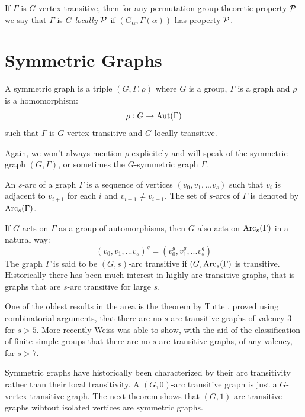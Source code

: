 If $\Gamma$ is $G$-vertex transitive,
then for any permutation group theoretic property $\mathcal{P}$
we say that $\Gamma$ is {\it $G$-locally $\mathcal{P}$}
if $(G_\alpha, \Gamma(\alpha))$ has property $\mathcal{P}$.

\section{Symmetric Graphs}

\begin{definition} 

A symmetric graph is a triple $(G,\Gamma,\rho)$
where $G$ is a group, $\Gamma$ is a graph
and $\rho$ is a homomorphism:
$$\rho : G \to \operatorname{Aut}(\Gamma)$$
such that $\Gamma$ is $G$-vertex transitive and $G$-locally transitive.
\end{definition}

Again, we won't always mention $\rho$ explicitely
and will speak of the symmetric graph $(G,\Gamma)$, or sometimes
the $G$-symmetric graph $\Gamma$.

\begin{definition} [s-arc]
An $s$-arc of a graph $\Gamma$ is a sequence of vertices $(v_0, v_1, ... v_s)$
such that $v_i$ is adjacent to $v_{i+1}$ for each $i$ and $v_{i-1} \neq v_{i+1}$.
The set of $s$-arcs of $\Gamma$ is denoted by $\operatorname{Arc}_s(\Gamma)$.
\end{definition}

If $G$ acts on $\Gamma$ as a group of automorphisms,
then $G$ also acts on $\operatorname{Arc}_s(\Gamma)$ in a natural way:
$$ (v_0, v_1, ... v_s)^g = (v_0^g, v_1^g, ... v_s^g)$$
The graph $\Gamma$ is said to be $(G,s)$-arc transitive if $(G, \operatorname{Arc}_s(\Gamma)$
is transitive.
Historically there has been much interest in highly arc-transitive graphs,
that is graphs that are $s$-arc transitive for large $s$.

One of the oldest results in the area is the theorem by Tutte \cite{TUTTE1,TUTTE2},
proved using combinatorial arguments,
that there are no $s$-arc transitive graphs
of valency $3$ for $s > 5$.
More recently Weiss \cite{WEISS} was able to show, with the aid
of the classification of finite simple groups
that there are no $s$-arc transitive graphs,
of any valency, for $s > 7$.

Symmetric graphs have historically been characterized by their arc transitivity
rather than their local transitivity.
A $(G,0)$-arc transitive graph is just a $G$-vertex transitive graph.
The next theorem shows that $(G,1)$-arc transitive graphs
wihtout isolated vertices are symmetric graphs.

